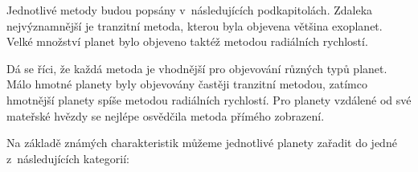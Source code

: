\documentclass[a4paper,12pt]{article}
\begin{document}
Jednotlivé metody budou popsány v~následujících podkapitolách. Zdaleka nejvýznamnější je tranzitní metoda, kterou byla objevena většina exoplanet. Velké množství planet bylo objeveno taktéž metodou radiálních rychlostí.~\cite{nasadata}


Dá se říci, že každá metoda je vhodnější pro objevování různých typů planet. Málo hmotné planety byly objevovány častěji tranzitní metodou, zatímco hmotnější planety spíše metodou radiálních rychlostí. Pro planety vzdálené od své mateřské hvězdy se nejlépe osvědčila metoda přímého zobrazení.~\cite{nasadata}


\newpage

Na základě známých charakteristik můžeme jednotlivé planety zařadit do jedné z~následujících kategorií:
\end{document}
